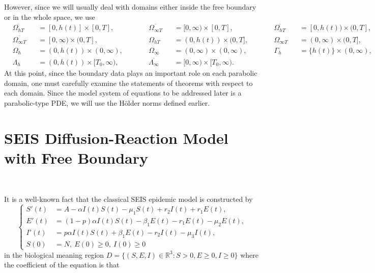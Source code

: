 \documentclass[11pt]{amsart}
\numberwithin{equation}{section}
\theoremstyle{plain}
\theoremstyle{definition}
\begin{document}
However, since we will usually deal with domains either inside the free boundary or in the whole space, we use
\begin{equation*}
\begin{alignedat}{6}
&\overline{\Omega_{hT}} &&= [0,h(t)]\times[0,T],\qquad
&&\overline{\Omega_{\infty T}} &&= [0,\infty)\times[0,T],\qquad
&&\overline{\Omega_{hT}} &&= [0,h(t))\times(0,T],\\[6pt]
&\overline{\Omega_{\infty T}} &&= [0,\infty)\times(0,T],\qquad
&&\Omega_{hT} &&= (0,h(t))\times(0,T],\qquad
&&\Omega_{\infty T} &&= (0,\infty)\times(0,T],\\[6pt]
&\Omega_h &&= (0,h(t))\times(0,\infty),\qquad
&&\Omega_{\infty} &&= (0,\infty)\times(0,\infty),\qquad
&&\Gamma_h &&= \{h(t)\}\times(0,\infty),\\[6pt]
&\Lambda_h &&= (0,h(t))\times[T_0,\infty),\qquad
&&\overline{\Lambda_\infty} &&= [0,\infty)\times[T_0,\infty).
\end{alignedat}
\end{equation*}
At this point, since the boundary data plays an important role on each parabolic domain, one must carefully examine the statements of theorems with respect to each domain.
Since the model system of equations to be addressed later is a parabolic-type PDE, we will use the Hölder norms defined earlier.

\section{SEIS Diffusion-Reaction Model with Free Boundary}
\

It is a well-known fact that the classical SEIS epidemic model is constructed by 
	\begin{equation} \label{SEIS ODE}
		\left \{ \begin{aligned}
			S'(t)&=A-\alpha I(t)S(t)-\mu_1 S(t)+r_2 I(t)+r_1 E(t),
			\\
			E'(t)&=(1-p)\alpha I(t)S(t)-\beta_1 E(t)-r_1 E(t) -\mu_2 E(t),
			\\
			I'(t)&=p \alpha I(t)S(t)+\beta_1 E(t)-r_2 I(t)-\mu_3 I(t),
			\\
			S(0)&=N, \ E(0)\geq 0, \ I(0)\geq 0
		\end{aligned} \right.
	\end{equation}
	in the biological meaning region $D=\{(S,E,I) \in \mathbb{R}^3 :S>0,E \geq 0,I \geq 0\}$ \vspace{0.5cm} where the coefficient of the equation is that\\	 
	\
	
\end{document}
